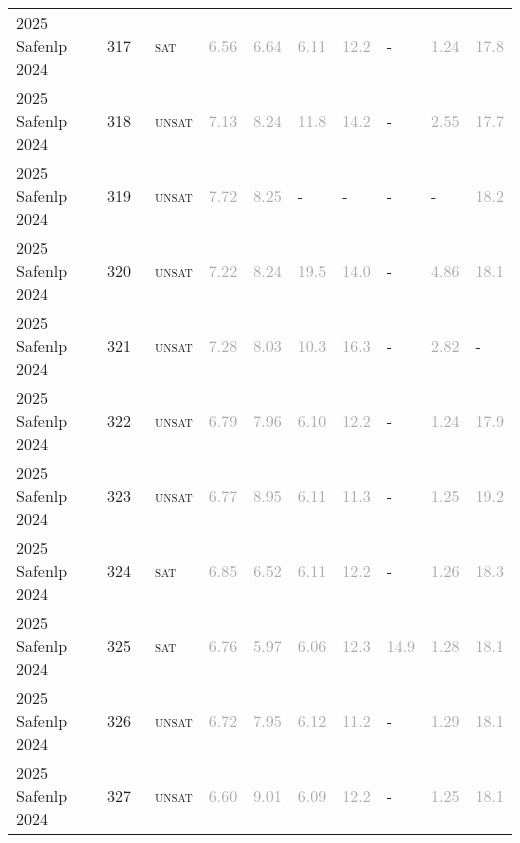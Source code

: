 \begin{center}
{\begin{longtable}{@{}llllllllll@{}}
2025 Safenlp 2024 & 317 & ~\textsc{sat} & \textcolor{darkgray}{6.56} & \textcolor{darkgray}{6.64} & \textcolor{darkgray}{6.11} & \textcolor{darkgray}{12.2} & - & \textcolor{darkgray}{1.24} & \textcolor{darkgray}{17.8} \\
2025 Safenlp 2024 & 318 & ~\textsc{unsat} & \textcolor{darkgray}{7.13} & \textcolor{darkgray}{8.24} & \textcolor{darkgray}{11.8} & \textcolor{darkgray}{14.2} & - & \textcolor{darkgray}{2.55} & \textcolor{darkgray}{17.7} \\
2025 Safenlp 2024 & 319 & ~\textsc{unsat} & \textcolor{darkgray}{7.72} & \textcolor{darkgray}{8.25} & - & - & - & - & \textcolor{darkgray}{18.2} \\
2025 Safenlp 2024 & 320 & ~\textsc{unsat} & \textcolor{darkgray}{7.22} & \textcolor{darkgray}{8.24} & \textcolor{darkgray}{19.5} & \textcolor{darkgray}{14.0} & - & \textcolor{darkgray}{4.86} & \textcolor{darkgray}{18.1} \\
2025 Safenlp 2024 & 321 & ~\textsc{unsat} & \textcolor{darkgray}{7.28} & \textcolor{darkgray}{8.03} & \textcolor{darkgray}{10.3} & \textcolor{darkgray}{16.3} & - & \textcolor{darkgray}{2.82} & - \\
2025 Safenlp 2024 & 322 & ~\textsc{unsat} & \textcolor{darkgray}{6.79} & \textcolor{darkgray}{7.96} & \textcolor{darkgray}{6.10} & \textcolor{darkgray}{12.2} & - & \textcolor{darkgray}{1.24} & \textcolor{darkgray}{17.9} \\
2025 Safenlp 2024 & 323 & ~\textsc{unsat} & \textcolor{darkgray}{6.77} & \textcolor{darkgray}{8.95} & \textcolor{darkgray}{6.11} & \textcolor{darkgray}{11.3} & - & \textcolor{darkgray}{1.25} & \textcolor{darkgray}{19.2} \\
2025 Safenlp 2024 & 324 & ~\textsc{sat} & \textcolor{darkgray}{6.85} & \textcolor{darkgray}{6.52} & \textcolor{darkgray}{6.11} & \textcolor{darkgray}{12.2} & - & \textcolor{darkgray}{1.26} & \textcolor{darkgray}{18.3} \\
2025 Safenlp 2024 & 325 & ~\textsc{sat} & \textcolor{darkgray}{6.76} & \textcolor{darkgray}{5.97} & \textcolor{darkgray}{6.06} & \textcolor{darkgray}{12.3} & \textcolor{darkgray}{14.9} & \textcolor{darkgray}{1.28} & \textcolor{darkgray}{18.1} \\
2025 Safenlp 2024 & 326 & ~\textsc{unsat} & \textcolor{darkgray}{6.72} & \textcolor{darkgray}{7.95} & \textcolor{darkgray}{6.12} & \textcolor{darkgray}{11.2} & - & \textcolor{darkgray}{1.29} & \textcolor{darkgray}{18.1} \\
2025 Safenlp 2024 & 327 & ~\textsc{unsat} & \textcolor{darkgray}{6.60} & \textcolor{darkgray}{9.01} & \textcolor{darkgray}{6.09} & \textcolor{darkgray}{12.2} & - & \textcolor{darkgray}{1.25} & \textcolor{darkgray}{18.1} \\

\end{longtable}}
\end{center}
